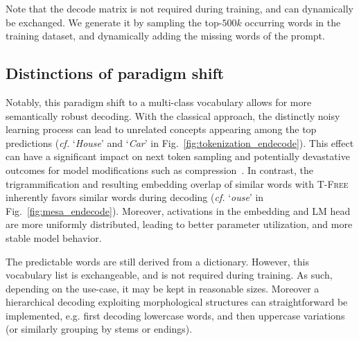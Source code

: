 \documentclass[11pt]{article}
\newcommand\todo[1]{\textcolor{red}{#1}}
\newcommand{\ps}[1]{\textcolor{purple}{PS: #1}}
\newcommand{\method}{\textsc{T-Free}}
\begin{document}
Note that the decode matrix is not required during training, and can dynamically be exchanged. We generate it by sampling the top-$500k$ occurring words in the training dataset, and dynamically adding the missing words of the prompt. 

\subsection{Distinctions of paradigm shift}
Notably, this paradigm shift to a multi-class vocabulary allows for more semantically robust decoding. With the classical approach, the distinctly noisy learning process can lead to unrelated concepts appearing among the top predictions (\emph{cf.} `\textit{House}' and `\textit{Car}' in Fig.~\ref{fig:tokenization_endecode}). This effect can have a significant impact on next token sampling and potentially devastative outcomes for model modifications such as compression~\cite{deiseroth2024divergent}. 
In contrast, the trigrammification and resulting embedding overlap of similar words with \method~
inherently favors similar words during decoding  (\emph{cf.} `\textit{ouse}' in Fig.~\ref{fig:mesa_endecode}).
Moreover, activations in the embedding and LM head are more uniformly distributed, leading to better parameter utilization, and more stable model behavior. 

The predictable words are still derived from a dictionary. However, this vocabulary list is exchangeable, and is not required during training. As such, depending on the use-case, it may be kept in reasonable sizes. Moreover a hierarchical decoding exploiting morphological structures can straightforward be implemented, e.g. first decoding lowercase words, and then uppercase variations (or similarly grouping by stems or endings).

\end{document}
